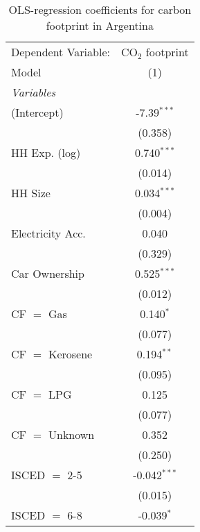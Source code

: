 
\begin{table}[htbp!]
   \centering
   \small
   \begin{adjustbox}{width = 1\textwidth, max height = 0.95\textheight, center}
      \begin{threeparttable}[b]
         \caption{\label{tab:OLS_2_ARG} OLS-regression coefficients for carbon footprint in Argentina}
         \begin{tabular}{lc}
            \tabularnewline \midrule \midrule
            Dependent Variable: & CO$_{2}$ footprint\\  
            Model               & (1)\\  
            \midrule
            \emph{Variables}\\
            (Intercept)         & -7.39$^{***}$\\   
                                & (0.358)\\   
            HH Exp. (log)       & 0.740$^{***}$\\   
                                & (0.014)\\   
            HH Size             & 0.034$^{***}$\\   
                                & (0.004)\\   
            Electricity Acc.    & 0.040\\   
                                & (0.329)\\   
            Car Ownership       & 0.525$^{***}$\\   
                                & (0.012)\\   
            CF $=$ Gas          & 0.140$^{*}$\\   
                                & (0.077)\\   
            CF $=$ Kerosene     & 0.194$^{**}$\\   
                                & (0.095)\\   
            CF $=$ LPG          & 0.125\\   
                                & (0.077)\\   
            CF $=$ Unknown      & 0.352\\   
                                & (0.250)\\   
            ISCED $=$ 2-5       & -0.042$^{***}$\\   
                                & (0.015)\\   
            ISCED $=$ 6-8       & -0.039$^{*}$\\   

\end{tabular}
\end{threeparttable}
\end{adjustbox}
\end{table}

